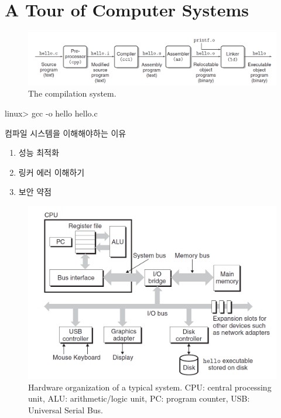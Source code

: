 

\chapter{A Tour of Computer Systems}


\begin{figure}[h!]
    \centering
    \includegraphics[scale=0.3]{pic/section12/pic1}
    \caption{The compilation system.}
\end{figure}

linux> gcc -o hello hello.c

컴파일 시스템을 이해해야하는 이유

\begin{enumerate}
    \item 성능 최적화
    \item 링커 에러 이해하기
    \item 보안 약점
\end{enumerate}


\begin{figure}[h!]
    \centering
    \includegraphics[scale=0.5]{pic/section12/pic2}
    \caption{Hardware organization
    of a typical system. CPU:
    central processing unit,
    ALU: arithmetic/logic unit,
    PC: program counter, USB:
    Universal Serial Bus.}
\end{figure}


